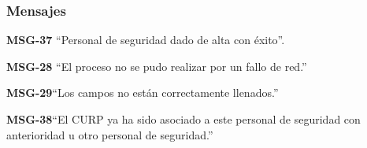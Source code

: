 \subsubsection{Mensajes}

\begin{Citemize}
    \item {\bf MSG-37} ``Personal de seguridad dado de alta con éxito''.
    \item {\bf MSG-28}  ``El proceso no se pudo realizar por un fallo de red.''
    \item {\bf MSG-29}{``Los campos no están correctamente llenados.''}
    \item {\bf MSG-38}{``El CURP ya ha sido asociado a este personal de seguridad con anterioridad u otro personal de seguridad.''}
    
\end{Citemize}

